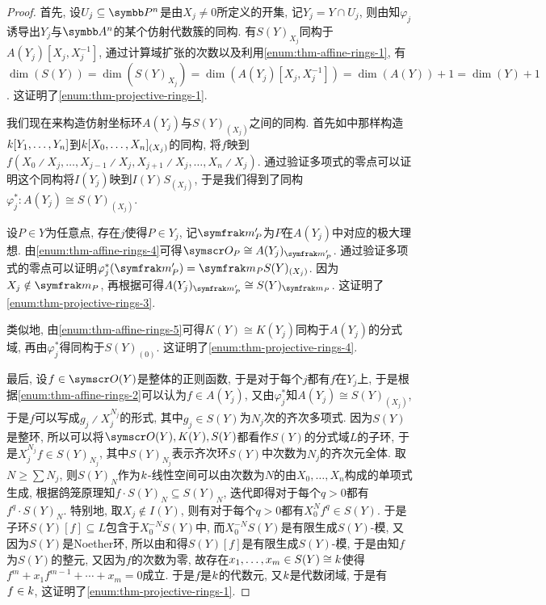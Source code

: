 \begin{proof}
  首先, 设$U_j\subseteq\PP^n$是由$X_j\neq 0$所定义的开集, 记$Y_j=Y\cap U_j$, 则由知$\varphi_j$诱导出$Y_j$与$\AF^n$的某个仿射代数簇的同构. 有$S(Y)_{X_j}$同构于$A(Y_j)[X_j, X_j^{-1}]$, 通过计算域扩张的次数以及利用\ref{enum:thm-affine-rings-1}, 有$\dim (S(Y))=\dim (S(Y)_{X_j})=\dim (A(Y_j)[X_j, X_j^{-1}])=\dim (A(Y))+1=\dim (Y)+1$. 这证明了\ref{enum:thm-projective-rings-1}.

  我们现在来构造仿射坐标环$A(Y_j)$与$S(Y)_{(X_j)}$之间的同构. 首先如中那样构造$k [Y_1, \dotsc, Y_n]$到$k [X_0, \dotsc, X_n]_{(X_j)}$的同构, 将$f$映到$f(X_0{\divslash}X_j, \dotsc, X_{j-1}{\divslash}X_j, X_{j+1}{\divslash}X_j, \dotsc, X_n{\divslash}X_j)$. 通过验证多项式的零点可以证明这个同构将$I(Y_j)$映到$I(Y)S_{(X_j)}$, 于是我们得到了同构$\varphi_j^*\colon A(Y_j)\cong S(Y)_{(X_j)}$.

  设$P\in Y$为任意点, 存在$j$使得$P\in Y_j$, 记$\ideal{m}_P'$为$P$在$A(Y_j)$中对应的极大理想. 由\ref{enum:thm-affine-rings-4}可得$\OO_P\cong A(Y_j)_{\ideal{m}_P'}$. 通过验证多项式的零点可以证明$\varphi_{j}^*(\ideal{m}_P')=\ideal{m}_PS(Y)_{(X_j)}$. 因为$X_j\notin \ideal{m}_P$, 再根据可得$A(Y_j)_{\ideal{m}_P'}\cong S(Y)_{\ideal{m}_P}$. 这证明了\ref{enum:thm-projective-rings-3}.

  类似地, 由\ref{enum:thm-affine-rings-5}可得$K(Y)\cong K(Y_j)$同构于$A(Y_j)$的分式域, 再由$\varphi_j^*$得同构于$S(Y)_{(0)}$. 这证明了\ref{enum:thm-projective-rings-4}.

  最后, 设$f\in\OO (Y)$是整体的正则函数, 于是对于每个$j$都有$f$在$Y_j$上, 于是根据\ref{enum:thm-affine-rings-2}可以认为$f\in A(Y_j)$, 又由$\varphi_j^*$知$A(Y_j)\cong S(Y)_{(X_j)}$, 于是$f$可以写成$g_j{\divslash}X_j^{N_j}$的形式, 其中$g_j\in S(Y)$为$N_j$次的齐次多项式. 因为$S(Y)$是整环, 所以可以将$\OO (Y), K(Y), S(Y)$都看作$S(Y)$的分式域$L$的子环, 于是$X_j^{N_j}f\in S(Y)_{N_j}$, 其中$S(Y)_{N_j}$表示齐次环$S(Y)$中次数为$N_j$的齐次元全体. 取$N\geq \sum N_j$, 则$S(Y)_N$作为$k$-线性空间可以由次数为$N$的由$X_0, \dotsc, X_n$构成的单项式生成, 根据鸽笼原理知$f\cdot S(Y)_N\subseteq S(Y)_N$, 迭代即得对于每个$q>0$都有$f^q\cdot S(Y)_N$. 特别地, 取$X_j\notin I(Y)$, 则有对于每个$q>0$都有$X_0^Nf^q\in S(Y)$. 于是子环$S(Y)[f]\subseteq L$包含于$X_0^{-N}S(Y)$中, 而$X_0^{-N}S(Y)$是有限生成$S(Y)$-模, 又因为$S(Y)$是Noether环, 所以由和得$S(Y)[f]$是有限生成$S(Y)$-模, 于是由知$f$为$S(Y)$的整元, 又因为$f$的次数为零, 故存在$x_1, \dotsc, x_m\in S(Y)\cong k$使得$f^m+x_1f^{m-1}+\dotsb +x_m=0$成立. 于是$f$是$k$的代数元, 又$k$是代数闭域, 于是有$f\in k$, 这证明了\ref{enum:thm-projective-rings-1}.
\end{proof}

